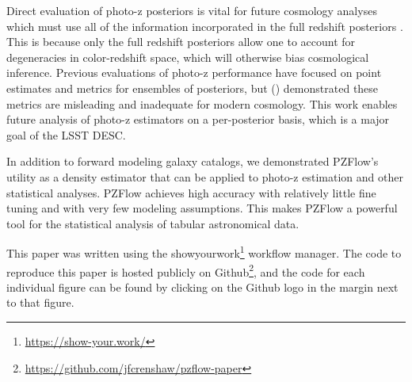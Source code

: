 \documentclass[twocolumn,twocolappendix,linenumbers]{aastex631}
\newcommand{\citePZt}{\citetalias{schmidt2020} (\citeyear{schmidt2020})\xspace}
\begin{document}
Direct evaluation of photo-z posteriors is vital for future cosmology analyses which must use all of the information incorporated in the full redshift posteriors \citep{newman2022}.
This is because only the full redshift posteriors allow one to account for degeneracies in color-redshift space, which will otherwise bias cosmological inference.
Previous evaluations of photo-z performance have focused on point estimates and metrics for ensembles of posteriors, but \citePZt demonstrated these metrics are misleading and inadequate for modern cosmology.
This work enables future analysis of photo-z estimators on a per-posterior basis, which is a major goal of the LSST DESC.

In addition to forward modeling galaxy catalogs, we demonstrated PZFlow's utility as a density estimator that can be applied to photo-z estimation and other statistical analyses.
PZFlow achieves high accuracy with relatively little fine tuning and with very few modeling assumptions.
This makes PZFlow a powerful tool for the statistical analysis of tabular astronomical data.

This paper was written using the showyourwork\footnote{\url{https://show-your.work/}} workflow manager.
The code to reproduce this paper is hosted publicly on Github\footnote{\url{https://github.com/jfcrenshaw/pzflow-paper}}, and the code for each individual figure can be found by clicking on the Github logo in the margin next to that figure.
\end{document}
